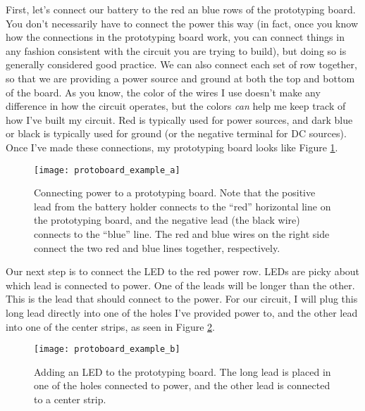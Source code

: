 First, let's connect our battery to the red an blue rows of the 
prototyping board. You don't necessarily have to connect the power this way 
(in fact, once you know how the connections in the prototyping board work, you
can connect things in any fashion consistent with the circuit you are trying 
to build), but doing so is generally considered good practice. We can also
connect each set of row together, so that we are providing a power 
source and ground at both the top and bottom of the board. As you know, the
color of the wires I use doesn't make any difference in how the circuit 
operates, but the colors \textit{can} help me keep track of how I've built my
circuit. Red is typically used for power sources, and dark blue or black is
typically used for ground (or the negative terminal for DC sources). Once I've
made these connections, my prototyping board looks like Figure
\ref{fig:protoboard_example_a}.
\begin{figure}[htbp!]
\centering
\texttt{[image: protoboard\_example\_a]}
\caption[Connecting power to a prototyping board]{Connecting power to a 
prototyping board. Note that the positive lead from the battery holder
connects to the ``red'' horizontal line on the prototyping board, and the
negative lead (the black wire) connects to the ``blue'' line. The red and
blue wires on the right side connect the two red and blue lines together,
respectively.}
\label{fig:protoboard_example_a}
\end{figure}

Our next step is to connect the LED to the red power row. LEDs are picky 
about which lead is connected to power. One of the leads will be longer than the
other. This is the lead that should connect to the power. For our circuit, I 
will plug this long lead directly into one of the holes I've provided power to,
and the other lead into one of the center strips, as seen in Figure
\ref{fig:protoboard_example_b}.
\begin{figure}[htbp!]
\centering
\texttt{[image: protoboard\_example\_b]}
\caption[Adding an LED to the prototyping board]{Adding an LED to the 
prototyping board. The long lead is placed in one of the holes connected
to power, and the other lead is connected to a center strip.}
\label{fig:protoboard_example_b}
\end{figure}

